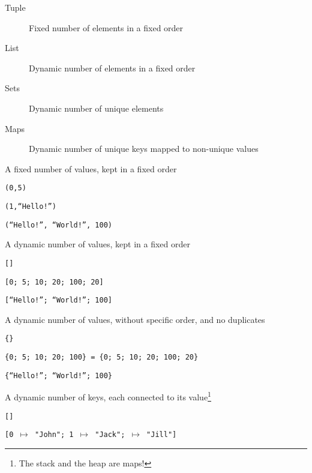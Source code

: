 \documentclass{beamer}
\begin{document}
\begin{textslide}{
\begin{description}
\item[Tuple] Fixed number of elements in a fixed order
\item[List] Dynamic number of elements in a fixed order
\item[Sets] Dynamic number of unique elements
\item[Maps] Dynamic number of unique keys mapped to non-unique values
\end{description}
}\end{textslide}

\begin{slide}{
\item A fixed number of values, kept in a fixed order
\item \texttt{(0,5)}
\item \texttt{(1,``Hello!'')}
\item \texttt{(``Hello!'', ``World!'', 100)}
}\end{slide}

\begin{slide}{
\item A dynamic number of values, kept in a fixed order
\item \texttt{[]}
\item \texttt{[0; 5; 10; 20; 100; 20]}
\item \texttt{[``Hello!''; ``World!''; 100]}
}\end{slide}

\begin{slide}{
\item A dynamic number of values, without specific order, and no duplicates
\item \texttt{\{\}}
\item \texttt{\{0; 5; 10; 20; 100\} = \{0; 5; 10; 20; 100; 20\}}
\item \texttt{\{``Hello!''; ``World!''; 100\}}
}\end{slide}

\begin{slide}{
\item A dynamic number of keys, each connected to its value\footnote{The stack and the heap are maps!}
\item \texttt{[]}
\item \texttt{[0 $\mapsto$ "John"; 1 $\mapsto$ "Jack"; $\mapsto$ "Jill"]}
}\end{slide}
\end{document}
